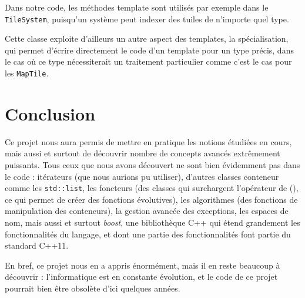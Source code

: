 \documentclass[a4paper,10pt]{report}
\begin{document}
Dans notre code, les méthodes template sont utilisés par exemple dans le \texttt{TileSystem}, puisqu'un système peut indexer des tuiles de n'importe quel type.

Cette classe exploite d'ailleurs un autre aspect des templates, la spécialisation, qui permet d'écrire directement le code d'un template pour un type précis, dans le cas où ce type nécessiterait un traitement particulier comme c'est le cas pour les \texttt{MapTile}.


\chapter*{Conclusion}
Ce projet nous aura permis de mettre en pratique les notions étudiées en cours, mais aussi et surtout de découvrir nombre de concepts avancés extrêmement puissants. Tous ceux que nous avons découvert ne sont bien évidemment pas dans le code : itérateurs (que nous aurions pu utiliser), d'autres classes conteneur comme les \texttt{std::list}, les foncteurs (des classes qui surchargent l'opérateur de (), ce qui permet de créer des fonctions évolutives), les algorithmes (des fonctions de manipulation des conteneurs), la gestion avancée des exceptions, les espaces de nom, mais aussi et surtout \textit{boost}, une bibliothèque C++ qui étend grandement les fonctionnalités du langage, et dont une partie des fonctionnalités font partie du standard C++11.

En bref, ce projet nous en a appris énormément, mais il en reste beaucoup à découvrir : l'informatique est en constante évolution, et le code de ce projet pourrait bien être obsolète d'ici quelques années.

\appendix
\listoffigures
\end{document}

